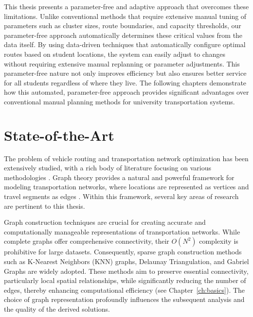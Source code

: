 This thesis presents a parameter-free and adaptive approach that overcomes these limitations. Unlike conventional methods that require extensive manual tuning of parameters such as cluster sizes, route boundaries, and capacity thresholds, our parameter-free approach automatically determines these critical values from the data itself. By using data-driven techniques that automatically configure optimal routes based on student locations, the system can easily adjust to changes without requiring extensive manual replanning or parameter adjustments. This parameter-free nature not only improves efficiency but also ensures better service for all students regardless of where they live. The following chapters demonstrate how this automated, parameter-free approach provides significant advantages over conventional manual planning methods for university transportation systems.

\section{State-of-the-Art}
\label{sec:intro_sota}
The problem of vehicle routing and transportation network optimization has been extensively studied, with a rich body of literature focusing on various methodologies \cite{toth2014vehicle}. Graph theory provides a natural and powerful framework for modeling transportation networks, where locations are represented as vertices and travel segments as edges \cite{tarapata2019graph}. Within this framework, several key areas of research are pertinent to this thesis.

Graph construction techniques are crucial for creating accurate and computationally manageable representations of transportation networks. While complete graphs offer comprehensive connectivity, their $O(N^2)$ complexity is prohibitive for large datasets. Consequently, sparse graph construction methods such as K-Nearest Neighbors (KNN) graphs, Delaunay Triangulation, and Gabriel Graphs are widely adopted. These methods aim to preserve essential connectivity, particularly local spatial relationships, while significantly reducing the number of edges, thereby enhancing computational efficiency (see Chapter~\ref{ch:basics}). The choice of graph representation profoundly influences the subsequent analysis and the quality of the derived solutions.


